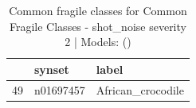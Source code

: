 \begin{table}
\caption{Common fragile classes for Common Fragile Classes - shot_noise severity 2 | Models: ()}
\label{tab:Common Fragile Classes - shot_noise severity 2_d41d8cd9}
\begin{tabular}{cll}
\toprule
 & synset & label \\
\midrule
49 & n01697457 & African_crocodile \\
\bottomrule
\end{tabular}
\end{table}
